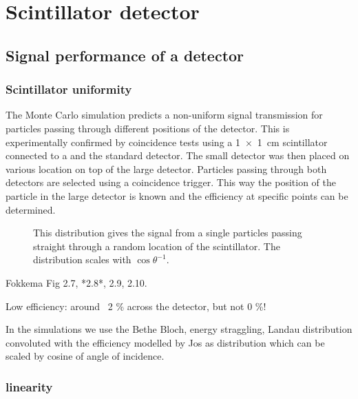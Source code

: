 \chapter{Scintillator detector}
\label{ch:detector}


\section{Signal performance of a detector}
\label{sec:detector-signal}

\subsection{Scintillator uniformity}

The Monte Carlo simulation predicts a non-uniform signal transmission for particles passing through different positions of the detector. This is experimentally confirmed by coincidence tests using a \SI[product-units = repeat]{1 x 1}{\centi\meter} scintillator connected to a \pmt and the standard detector. The small detector was then placed on various location on top of the large detector. Particles passing through both detectors are selected using a coincidence trigger. This way the position of the particle in the large detector is known and the efficiency at specific points can be determined.



\begin{figure}
    \centering
    
    \caption{ This distribution gives
             the signal from a single particles passing straight through
             a random location of the scintillator. The distribution
             scales with $\cos{\theta}^{-1}$.}
    \label{fig:signal_efficiency}
\end{figure}

Fokkema Fig 2.7, *2.8*, 2.9, 2.10.

Low efficiency: around ~2 \% across the detector, but not 0 \%!



In the simulations we use the Bethe Bloch, energy straggling, Landau
distribution convoluted with the efficiency modelled by Jos as
distribution which can be scaled by cosine of angle of incidence.



\subsection{\pmt linearity}

